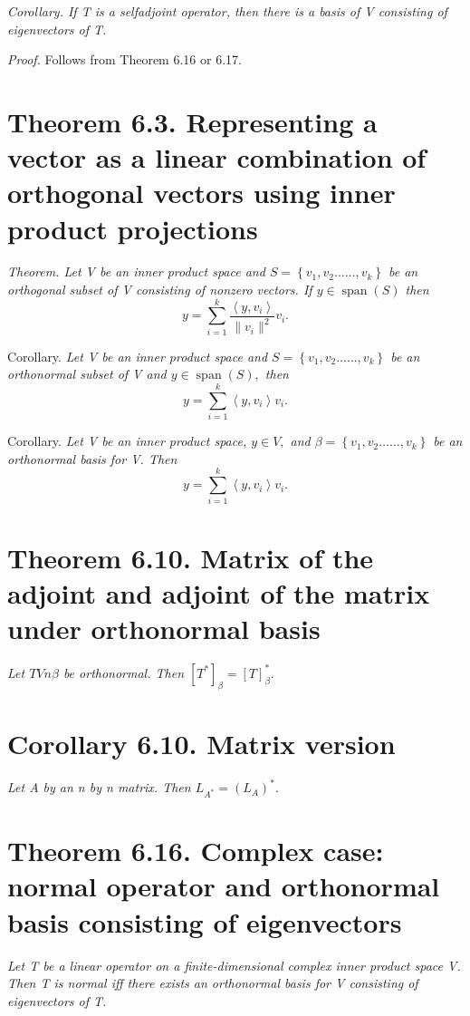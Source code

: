 \documentclass[12pt,english]{article}
\begin{document}
\emph{Corollary. If T is a selfadjoint operator, then there is a basis
of V consisting of eigenvectors of T.}

\emph{Proof. }Follows from Theorem 6.16 or 6.17.

\section{Theorem 6.3. Representing a vector as a linear combination of orthogonal
vectors using inner product projections}

\emph{Theorem. Let V be an inner product space and $S=\left\{ v_{1},v_{2}\dots\ldots,v_{k}\right\} $
be an orthogonal subset of V consisting of nonzero vectors. If $y\in\operatorname{span}(S)$
then
\[
y=\sum_{i=1}^{k}\frac{\left\langle y,v_{i}\right\rangle }{\|v_{i}\|^{2}}v_{i}.
\]
}

Corollary. \emph{Let V be an inner product space and $S=\left\{ v_{1},v_{2}\dots\ldots,v_{k}\right\} $
be an orthonormal subset of V and $y\in\operatorname{span}(S),$ then
\[
y=\sum_{i=1}^{k}\left\langle y,v_{i}\right\rangle v_{i}.
\]
}

Corollary. \emph{Let V be an inner product space, $y\in V,$ and $\beta=\left\{ v_{1},v_{2}\dots\ldots,v_{k}\right\} $
be an orthonormal basis for V. Then
\[
y=\sum_{i=1}^{k}\left\langle y,v_{i}\right\rangle v_{i}.
\]
}

\section{Theorem 6.10. Matrix of the adjoint and adjoint of the matrix under
orthonormal basis}

\emph{Let $TVn\beta$ be orthonormal. Then $[T^{*}]_{\beta}=\left[T\right]_{\beta}^{*}.$}

\section{Corollary 6.10. Matrix version}

\emph{Let A by an n by n matrix. Then $L_{A^{*}}=(L_{A})^{*}.$}

\section{Theorem 6.16. Complex case: normal operator and orthonormal basis
consisting of eigenvectors}

\emph{Let T be a linear operator on a finite-dimensional complex inner
product space V. Then T is normal iff there exists an orthonormal
basis for V consisting of eigenvectors of T.}
\end{document}
